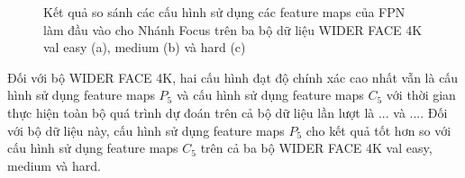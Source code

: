 {    \begin{figure}[H]
        \centering
        \caption{Kết quả so sánh các cấu hình sử dụng các feature maps  của FPN làm đầu vào cho Nhánh Focus  trên ba bộ dữ liệu WIDER FACE 4K val easy (a), medium (b) và hard (c)}
        \label{fig:retinafocus_widerface_4k_val_fpn}
    \end{figure}

    \noindent
    Đối với bộ WIDER FACE 4K, hai cấu hình đạt độ chính xác cao nhất vẫn là cấu hình sử dụng feature maps  ${P}_{5}$ và cấu hình sử dụng feature maps  ${C}_{5}$ với thời gian thực hiện toàn bộ quá trình dự đoán trên cả bộ dữ liệu lần lượt là ... và ....
    Đối với bộ dữ liệu này, cấu hình sử dụng feature maps  ${P}_{5}$ cho kết quả tốt hơn so với cấu hình sử dụng feature maps  ${C}_{5}$ trên cả ba bộ WIDER FACE 4K val easy, medium và hard.

}
